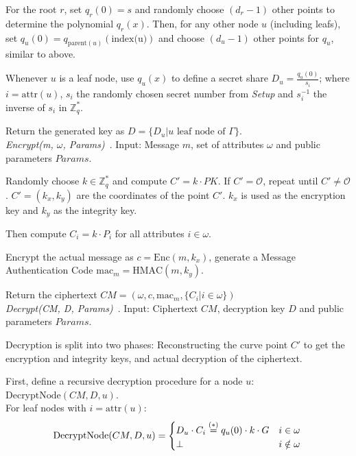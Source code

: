 For the root $r$, set $q_r(0) = s$ and randomly choose $(d_r - 1)$ other points to determine the polynomial $q_r(x)$.
Then, for any other node $u$ (including leafs), set $q_u(0) = q_{\text{parent}(u)}(\text{index(u)})$ and choose $(d_u -1)$ other points for $q_u$, similar to above.

Whenever $u$ is a leaf node, use $q_u(x)$ to define a secret share $D_u = \frac{q_u(0)}{s_i}$; where $i = \text{attr}(u)$, $s_i$ the randomly chosen secret number from \emph{Setup} and $s_i^{-1}$ the inverse of $s_i$ in $\mathbb{Z}_q^*$.

Return the generated key as $D = \{D_u | u \text{ leaf node of } \Gamma\}$.\\

\emph{Encrypt(m, $\omega$, Params)}~\cite{yao_lightweight_2015}.
Input: Message $m$, set of attributes $\omega$ and public parameters $Params$.

Randomly choose $k \in \mathbb{Z}_q^*$ and compute $C' = k \cdot PK$. If $C' = \mathcal{O}$, repeat until $C' \neq \mathcal{O}$.
$C' = (k_x, k_y)$ are the coordinates of the point $C'$. $k_x$ is used as the encryption key and $k_y$ as the integrity key.

Then compute $C_i = k \cdot P_i$ for all attributes $i \in \omega$.

Encrypt the actual message as $c = \text{Enc}(m, k_x)$, generate a Message Authentication Code $\text{mac}_m = \text{HMAC}(m, k_y)$.

Return the ciphertext $CM = (\omega, c, \text{mac}_m, \{C_i | i \in \omega\})$\\

\emph{Decrypt(CM, D, Params)}~\cite{yao_lightweight_2015}. Input: Ciphertext $CM$, decryption key $D$ and public parameters $Params$.

Decryption is split into two phases: Reconstructing the curve point $C'$ to get the encryption and integrity keys, and actual decryption of the ciphertext.

First, define a recursive decryption procedure for a node $u$: $\text{DecryptNode}(CM, D, u)$. \\ %
For leaf nodes with $i = \text{attr}(u)$:
\begin{equation*}
    \text{DecryptNode}(CM, D, u) = \begin{cases}
        D_u \cdot C_i \stackrel{(*)}{=} q_u(0) \cdot k \cdot G & i \in \omega\\
        \perp & i \notin \omega
    \end{cases}\\
\end{equation*}

